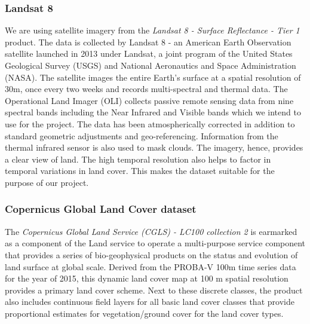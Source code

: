 \documentclass[12pt, a4paper]{report}
\begin{document}
\subsubsection{Landsat 8}
We are using satellite imagery from the \textit{Landsat 8 - Surface Reflectance - Tier 1} product. The data is collected by Landsat 8 - an American Earth Observation satellite launched in 2013 under Landsat, a joint program of the United States Geological Survey (USGS) and National Aeronautics and Space Administration (NASA). The satellite images the entire Earth's surface at a spatial resolution of 30m, once every two weeks and records multi-spectral and thermal data. The Operational Land Imager (OLI) collects passive remote sensing data from nine spectral bands including the Near Infrared and Visible bands which we intend to use for the project. The data has been atmospherically corrected in addition to standard geometric adjustments and geo-referencing. Information from the thermal infrared sensor is also used to mask clouds. The imagery, hence, provides a clear view of land. The high temporal resolution also helps to factor in temporal variations in land cover. This makes the dataset suitable for the purpose of our project.\cite{geel8, l8}
\subsubsection{Copernicus Global Land Cover dataset}
The \textit{Copernicus Global Land Service (CGLS) - LC100 collection 2} is earmarked as a component of the Land service to operate a multi-purpose service component that provides a series of bio-geophysical products on the status and evolution of land surface at global scale. Derived from the PROBA-V 100m time series data for the year of 2015, this dynamic land cover map at 100 m spatial resolution provides a primary land cover scheme. Next to these discrete classes, the product also includes continuous field layers for all basic land cover classes that provide proportional estimates for vegetation/ground cover for the land cover types.\cite{geecglc}
\end{document}
